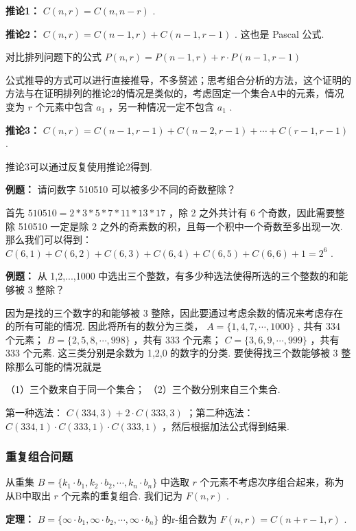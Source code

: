 \documentclass[cn, hazy, blue, normal, 12pt]{elegantnote}
\begin{document}
\textbf{推论1：}  $ C(n,r)=C(n,n-r) $ .

\textbf{推论2：}  $ C(n,r)=C(n-1,r)+C(n-1,r-1) $ . 这也是 Pascal 公式.

对比排列问题下的公式 $ P(n,r)=P(n-1,r)+r\cdot P(n-1,r-1) $

公式推导的方式可以进行直接推导，不多赘述；思考组合分析的方法，这个证明的方法与在证明排列的推论2的情况是类似的，考虑固定一个集合A中的元素，情况变为 $ r $ 个元素中包含 $ a_1 $ ，另一种情况一定不包含 $ a_1 $ .

\textbf{推论3：}  $ C(n,r)=C(n-1,r-1)+C(n-2,r-1)+\cdots +C(r-1,r-1) $ .

推论3可以通过反复使用推论2得到.

\textbf{例题：} 请问数字 510510 可以被多少不同的奇数整除？

首先 $ 510510=2*3*5*7*11*13*17 $ ，除 2 之外共计有 6 个奇数，因此需要整除 510510 一定是除 2 之外的奇素数的积，且每一个积中一个奇数至多出现一次. 那么我们可以得到： $ C(6,1)+C(6,2)+C(6,3)+C(6,4)+C(6,5)+C(6,6)+1=2^6 $ .

\textbf{例题：} 从 1,2,...,1000 中选出三个整数，有多少种选法使得所选的三个整数的和能够被 3 整除？

因为是找的三个数字的和能够被 3 整除，因此要通过考虑余数的情况来考虑存在的所有可能的情况. 因此将所有的数分为三类， $ A=\{1,4,7,\cdots,1000\} $ , 共有 334 个元素； $ B=\{2,5,8,\cdots,998\} $ ，共有 333 个元素； $ C=\{3,6,9,\cdots,999\} $ ，共有 333 个元素. 这三类分别是余数为 1,2,0 的数字的分类. 要使得找三个数能够被 3 整除那么可能的情况就是

（1）三个数来自于同一个集合；
（2）三个数分别来自三个集合.

第一种选法： $ C(334,3)+2\cdot C(333,3) $ ；第二种选法： $ C(334,1)\cdot C(333,1)\cdot C(333,1) $ ，然后根据加法公式得到结果.

\subsubsection{重复组合问题}

从重集 $ B=\{k_1\cdot b_1,k_2\cdot b_2,\cdots ,k_n\cdot b_n\} $ 中选取 $ r $ 个元素不考虑次序组合起来，称为从B中取出 $ r $ 个元素的重复组合. 我们记为 $ F(n,r) $ .

\textbf{定理：} $ B=\{\infty\cdot b_1,\infty\cdot b_2,\cdots,\infty\cdot b_n\} $ 的r-组合数为 $ F(n,r)=C(n+r-1,r) $ .
\end{document}
